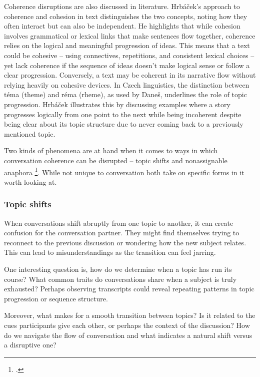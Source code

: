 \documentclass[12pt]{report}
\begin{document}
{\par
Coherence disruptions are also discussed in literature.
Hrbáček’s approach to coherence and cohesion in text distinguishes the two concepts,
noting how they often interact but can also be independent.
He highlights that while
cohesion involves grammatical or lexical links that
make sentences flow together,
coherence relies on the logical and meaningful progression of ideas.
This means that a text could be cohesive –
using connectives, repetitions, and consistent lexical choices –
yet lack coherence if the sequence of ideas doesn’t
make logical sense or follow a clear progression.
Conversely, a text may be coherent in its narrative flow without
relying heavily on cohesive devices.
In Czech linguistics,
the distinction between téma (theme) and réma (rheme), as used by Daneš,
underlines the role of topic progression.
Hrbáček illustrates this by discussing examples where
a story progresses logically from one point to the next while
being incoherent despite being clear about its topic structure
due to never coming back to a previously mentioned topic.

\par
Two kinds of phenomena are at hand when it comes to
ways in which conversation coherence can be disrupted –
topic shifts and nonassignable anaphora \footcite{bublitz1999disturbed}.
While not unique to conversation
both take on specific forms in it worth looking at.

\subsubsection{Topic shifts}
\par
    When conversations shift abruptly from one topic to another,
    it can create confusion for the conversation partner.
    They might find themselves trying to
    reconnect to the previous discussion or
    wondering how the new subject relates.
    This can lead to misunderstandings
    as the transition can feel jarring.

\par
    One interesting question is,
    how do we determine when a topic has run its course?
    What common traits do conversations share when a subject is truly exhausted?
    Perhaps observing transcripts could reveal repeating patterns in topic progression or sequence structure.

\par
    Moreover, what makes for a smooth transition between topics?
    Is it related to the cues participants give each other,
    or perhaps the context of the discussion?
    How do we navigate the flow of conversation and
    what indicates a natural shift versus a disruptive one?

}
\end{document}
